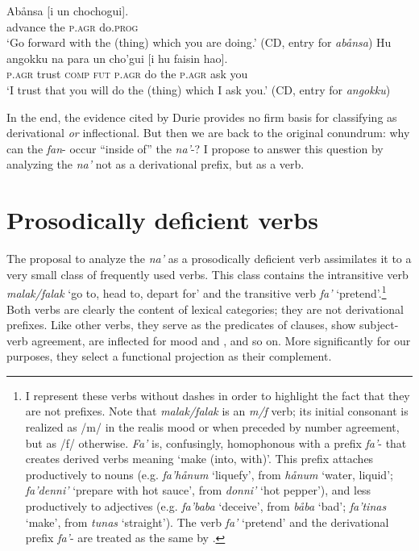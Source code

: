 \documentclass[output=paper,
modfonts
]{LSP/langsci}
\begin{document}
\begin{exe}
\begin{xlist}
\ea \label{ex:chung:20}
	\ea \label{ex:chung:20a}\gll  Abånsa {[}i un chochogui{]}.\\
		advance the \textsc{p.agr} do.\textsc{prog}\\
		\glt `Go forward with the (thing) which you are doing.' (CD, entry for
		\emph{abånsa})
	\ex \label{ex:chung:20b} \gll Hu angokku na para un cho'gui {[}i hu faisin hao{]}.\\
		\textsc{p.agr} trust \textsc{comp} \textsc{fut} \textsc{p.agr} do the \textsc{p.agr} ask
		you\\
		\glt `I trust that you will do the (thing) which I ask you.' (CD, entry for
		\emph{angokku})
	\z
\z

In the end, the evidence cited by Durie provides no firm basis for
classifying  as derivational \emph{or} inflectional. But
then we are back to the original conundrum: why can the 
\emph{fan}- occur ``inside of'' the  \emph{na'}-? I propose to
answer this question by analyzing the  \emph{na'} not as a
derivational prefix, but as a  verb.

\section{Prosodically deficient verbs}\label{sec:chung:5}

The proposal to analyze the  \emph{na'} as a prosodically
deficient verb assimilates it to a very small class of frequently used
 verbs. This class contains the intransitive verb
\emph{malak/falak} `go to, head to, depart for' and the transitive verb
\emph{fa'} `pretend'.\footnote{I represent these verbs without dashes in
  order to highlight the fact that they are not prefixes. Note that
  \emph{malak/falak} is an \emph{m/f} verb; its initial consonant is
  realized as /m/ in the realis mood or when preceded by  number
  agreement, but as /f/ otherwise. \emph{Fa'} is, confusingly,
  homophonous with a prefix \emph{fa'}- that creates derived verbs
  meaning `make (into, with)'. This prefix attaches productively to
  nouns (e.g. \emph{fa'hånum} `liquefy', from \emph{hånum} `water,
  liquid'; \emph{fa'denni'} `prepare with hot sauce', from \emph{donni'}
  `hot pepper'), and less productively to adjectives (e.g.
  \emph{fa'baba} `deceive', from \emph{båba} `bad'; \emph{fa'tinas}
  `make', from \emph{tunas} `straight'). The verb \emph{fa'} `pretend'
  and the derivational prefix \emph{fa'}- are treated as the same 
  by  \citet[176--77]{topping1973}.} Both verbs are clearly the
content of lexical categories; they are not derivational prefixes. Like
other verbs, they serve as the predicates of clauses, show subject-verb
agreement, are inflected for mood and , and so on. More
significantly for our purposes, they select a functional projection as
their complement.


\end{xlist}
\end{exe}
\end{document}
